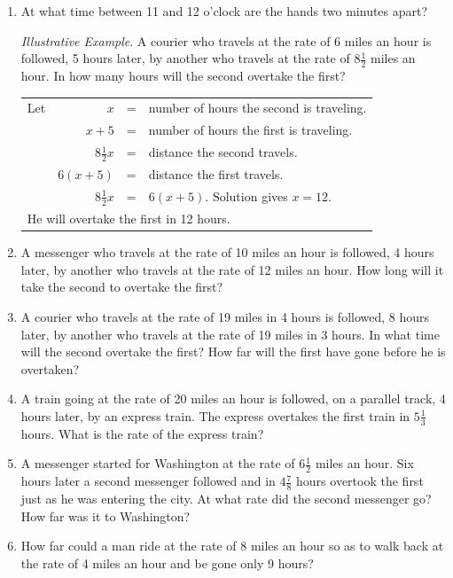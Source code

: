 \documentclass{book}
\begin{document}
\begin{enumerate}
\item At what time between 11 and 12 o'clock are the
hands two minutes apart?

\textit{Illustrative Example}. A courier who travels at the rate
of 6 miles an hour is followed, 5 hours later, by another
who travels at the rate of $8\frac{1}{2}$ miles an hour. In how many
hours will the second overtake the first?
\begin{tabular}{rrcl}
Let &             $x$ &=& number of hours the second is traveling. \\
    &         $x + 5$ &=& number of hours the first is traveling.  \\
    & $8\frac{1}{2}x$ &=& distance the second travels.             \\
    &        $6(x+5)$ &=& distance the first travels.              \\
    & $8\frac{1}{2}x$ &=& $6 (x + 5)$. Solution gives $x=12$.      \\
\multicolumn{4}{l}{He will overtake the first in 12 hours.}
\end{tabular}

\item A messenger who travels at the rate of 10 miles an
hour is followed, 4 hours later, by another who travels at
the rate of 12 miles an hour. How long will it take the
second to overtake the first?

\item A courier who travels at the rate of 19 miles in 4 hours
is followed, 8 hours later, by another who travels at the rate
of 19 miles in 3 hours. In what time will the second
overtake the first? How far will the first have gone
before he is overtaken?

\item A train going at the rate of 20 miles an hour is
followed, on a parallel track, 4 hours later, by an express
train. The express overtakes the first train in $5\frac{1}{3}$ hours.
What is the rate of the express train?

\item A messenger started for Washington at the rate of
$6\frac{1}{2}$ miles an hour. Six hours later a second messenger
followed and in $4\frac{7}{8}$ hours overtook the first just as he was
entering the city. At what rate did the second messenger
go? How far was it to Washington?

\item How far could a man ride at the rate of 8 miles an
hour so as to walk back at the rate of 4 miles an hour and
be gone only 9 hours?


\end{enumerate}
\end{document}
